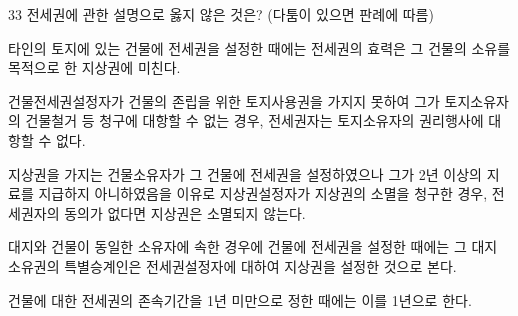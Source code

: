 \begin{question}{33}
전세권에 관한 설명으로 옳지 않은 것은? (다툼이 있으면 판례에 따름)
\begin{choices}
  \item 타인의 토지에 있는 건물에 전세권을 설정한 때에는 전세권의 효력은 그 건물의 소유를 목적으로 한 지상권에 미친다.
  \item 건물전세권설정자가 건물의 존립을 위한 토지사용권을 가지지 못하여 그가 토지소유자의 건물철거 등 청구에 대항할 수 없는 경우, 전세권자는 토지소유자의 권리행사에 대항할 수 없다.
  \item 지상권을 가지는 건물소유자가 그 건물에 전세권을 설정하였으나 그가 2년 이상의 지료를 지급하지 아니하였음을 이유로 지상권설정자가 지상권의 소멸을 청구한 경우, 전세권자의 동의가 없다면 지상권은 소멸되지 않는다.
  \item 대지와 건물이 동일한 소유자에 속한 경우에 건물에 전세권을 설정한 때에는 그 대지 소유권의 특별승계인은 전세권설정자에 대하여 지상권을 설정한 것으로 본다.
  \item 건물에 대한 전세권의 존속기간을 1년 미만으로 정한 때에는 이를 1년으로 한다.
\end{choices}
\end{question}
